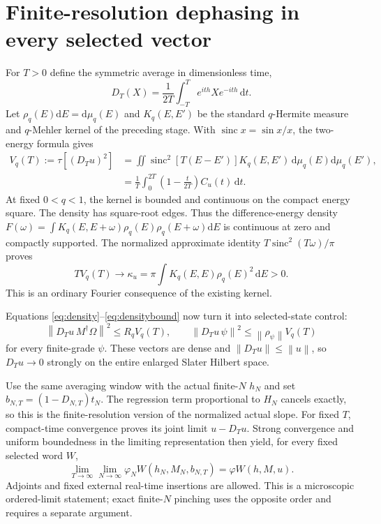 \documentclass[11pt]{article}
\newcommand{\dd}{\mathrm d}
\newcommand{\norm}[1]{\left\lVert#1\right\rVert}
\newcommand{\sinc}{\operatorname{sinc}}
\begin{document}
\newpage
\section{Finite-resolution dephasing in every selected vector}
For $T>0$ define the symmetric average in dimensionless time,
\begin{equation}
 D_T(X)=\frac1{2T}\int_{-T}^T e^{ith}Xe^{-ith}\,\dd t.
\end{equation}
Let $\rho_q(E)\dd E=\dd\mu_q(E)$ and $K_q(E,E')$ be the
standard $q$-Hermite measure and $q$-Mehler kernel of the preceding
stage. With $\sinc x=\sin x/x$, the two-energy formula gives
\begin{align}
 V_q(T):=\tau[(D_Tu)^2]
 &=\iint\sinc^2[T(E-E')]K_q(E,E')\,\dd\mu_q(E)\dd\mu_q(E'),\\
 &=\frac1T\int_0^{2T}\left(1-\frac t{2T}\right)C_u(t)\,\dd t.
\end{align}
At fixed $0<q<1$, the kernel is bounded and continuous on the
compact energy square. The density has square-root edges. Thus
the difference-energy density
$F(\omega)=\int K_q(E,E+\omega)\rho_q(E)\rho_q(E+\omega)\dd E$
is continuous at zero and compactly supported. The normalized
approximate identity $T\sinc^2(T\omega)/\pi$ proves
\begin{equation}\label{eq:asymptotic}
 T V_q(T)\longrightarrow\kappa_u
   =\pi\int K_q(E,E)\rho_q(E)^2\,\dd E>0.
\end{equation}
This is an ordinary Fourier consequence of the existing kernel.

Equations \eqref{eq:density}--\eqref{eq:densitybound} now turn it
into selected-state control:
\begin{equation}
 \norm{D_Tu\,M^\dagger\Omega}^2\le R_q V_q(T),\qquad
 \norm{D_Tu\,\psi}^2\le\norm{\rho_\psi}V_q(T)
\end{equation}
for every finite-grade $\psi$. These vectors are dense and
$\norm{D_Tu}\le\norm u$, so $D_Tu\to0$ strongly on the entire
enlarged Slater Hilbert space.

Use the same averaging window with the actual finite-$N$ $h_N$ and
set $b_{N,T}=(1-D_{N,T})t_N$. The regression term proportional to
$H_N$ cancels exactly, so this is the finite-resolution version
of the normalized actual slope. For fixed $T$, compact-time
convergence proves its joint limit $u-D_Tu$. Strong convergence
and uniform boundedness in the limiting representation then yield,
for every fixed selected word $W$,
\begin{equation}\label{eq:ordered}
 \lim_{T\to\infty}\lim_{N\to\infty}
 \varphi_N W(h_N,M_N,b_{N,T})=\varphi W(h,M,u).
\end{equation}
Adjoints and fixed external real-time insertions are allowed. This
is a microscopic ordered-limit statement; exact finite-$N$ pinching
uses the opposite order and requires a separate argument.
\end{document}
